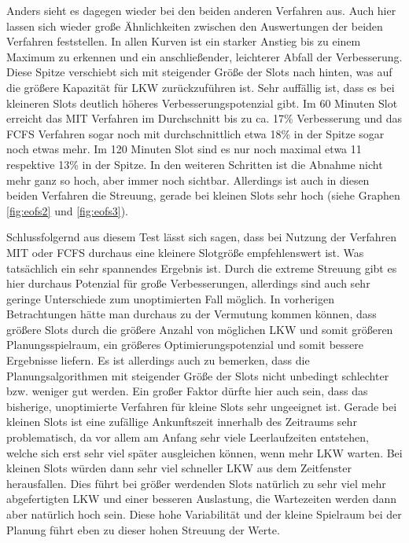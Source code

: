 Anders sieht es dagegen wieder bei den beiden anderen Verfahren aus. Auch hier lassen sich wieder große Ähnlichkeiten zwischen den Auswertungen der beiden Verfahren feststellen. In allen Kurven ist ein starker Anstieg bis zu einem Maximum zu erkennen und ein anschließender, leichterer Abfall der Verbesserung. Diese Spitze verschiebt sich mit steigender Größe der Slots nach hinten, was auf die größere Kapazität für LKW zurückzuführen ist. Sehr auffällig ist, dass es bei kleineren Slots deutlich höheres Verbesserungspotenzial gibt. Im 60 Minuten Slot erreicht das MIT Verfahren im Durchschnitt bis zu ca. 17\% Verbesserung und das FCFS Verfahren sogar noch mit durchschnittlich etwa 18\% in der Spitze sogar noch etwas mehr. Im 120 Minuten Slot sind es nur noch maximal etwa 11 respektive 13\% in der Spitze. In den weiteren Schritten ist die Abnahme nicht mehr ganz so hoch, aber immer noch sichtbar. Allerdings ist auch in diesen beiden Verfahren die Streuung, gerade bei kleinen Slots sehr hoch (siehe Graphen \ref{fig:eofs2} und \ref{fig:eofs3}).

Schlussfolgernd aus diesem Test lässt sich sagen, dass bei Nutzung der Verfahren MIT oder FCFS durchaus eine kleinere Slotgröße empfehlenswert ist. Was tatsächlich ein sehr spannendes Ergebnis ist. Durch die extreme Streuung gibt es hier durchaus Potenzial für große Verbesserungen, allerdings sind auch sehr geringe Unterschiede zum unoptimierten Fall möglich. In vorherigen Betrachtungen hätte man durchaus zu der Vermutung kommen können, dass größere Slots durch die größere Anzahl von möglichen LKW und somit größeren Planungsspielraum, ein größeres Optimierungspotenzial und somit bessere Ergebnisse liefern. Es ist allerdings auch zu bemerken, dass die Planungsalgorithmen mit steigender Größe der Slots nicht unbedingt schlechter bzw. weniger gut werden. Ein großer Faktor dürfte hier auch sein, dass das bisherige, unoptimierte Verfahren für kleine Slots sehr ungeeignet ist. Gerade bei kleinen Slots ist eine zufällige Ankunftszeit innerhalb des Zeitraums sehr problematisch, da vor allem am Anfang sehr viele Leerlaufzeiten entstehen, welche sich erst sehr viel später ausgleichen können, wenn mehr LKW warten. Bei kleinen Slots würden dann sehr viel schneller LKW aus dem Zeitfenster herausfallen. Dies führt bei größer werdenden Slots natürlich zu sehr viel mehr abgefertigten LKW und einer besseren Auslastung, die Wartezeiten werden dann aber natürlich hoch sein. Diese hohe Variabilität und der kleine Spielraum bei der Planung führt eben zu dieser hohen Streuung der Werte.


